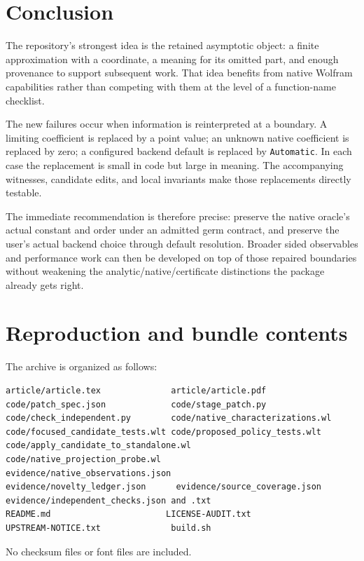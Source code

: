\documentclass[11pt,letterpaper]{article}
\newcommand{\code}[1]{\nolinkurl{#1}}
\begin{document}
\section{Conclusion}
The repository's strongest idea is the retained asymptotic object: a finite
approximation with a coordinate, a meaning for its omitted part, and enough
provenance to support subsequent work. That idea benefits from native Wolfram
capabilities rather than competing with them at the level of a function-name
checklist.

The new failures occur when information is reinterpreted at a boundary. A
limiting coefficient is replaced by a point value; an unknown native coefficient
is replaced by zero; a configured backend default is replaced by
\code{Automatic}. In each case the replacement is small in code but large in
meaning. The accompanying witnesses, candidate edits, and local invariants
make those replacements directly testable.

The immediate recommendation is therefore precise: preserve the native oracle's
actual constant and order under an admitted germ contract, and preserve the
user's actual backend choice through default resolution. Broader sided
observables and performance work can then be developed on top of those repaired
boundaries without weakening the analytic/native/certificate distinctions the
package already gets right.

\appendix
\section{Reproduction and bundle contents}\label{app:reproduce}
The archive is organized as follows:
\begin{lstlisting}
article/article.tex              article/article.pdf
code/patch_spec.json             code/stage_patch.py
code/check_independent.py        code/native_characterizations.wl
code/focused_candidate_tests.wlt code/proposed_policy_tests.wlt
code/apply_candidate_to_standalone.wl
code/native_projection_probe.wl
evidence/native_observations.json
evidence/novelty_ledger.json      evidence/source_coverage.json
evidence/independent_checks.json and .txt
README.md                       LICENSE-AUDIT.txt
UPSTREAM-NOTICE.txt              build.sh
\end{lstlisting}
No checksum files or font files are included.
\end{document}

